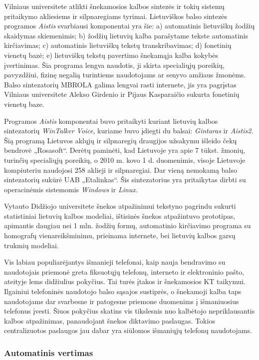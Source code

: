 \begin{multicols}{2}
    Vilniaus universitete atlikti šnekamosios kalbos sintezės ir tokių sistemų pritaikymo akliesiems ir silpnaregiams tyrimai. Lietuviškos balso sintezės programos \textit{Aistis} svarbiausi komponentai yra šie: a) automatinis lietuviškų žodžių skaidymas skiemenimis; b) žodžių lietuvių kalba parašytame tekste automatinis kirčiavimas; c) automatinis lietuviškų tekstų transkribavimas; d) fonetinių vienetų bazė; e) lietuviškų tekstų pavertimo šnekamąja kalba kokybės įvertinimas. Šia programa lengva naudotis, ji skirta specialiųjų poreikių, pavyzdžiui, fizinę negalią turintiems naudotojams ar senyvo amžiaus žmonėms. Balso sintezatorių MBROLA galima lengvai rasti internete, jis yra pagrįstas Vilniaus universitete Alekso Girdenio ir Pijaus Kasparaičio sukurta fonetinių vienetų baze.   

    Programos \textit{Aistis}  komponentai buvo pritaikyti kuriant lietuvių kalbos sintezatorių \textit{WinTalker Voice}, kuriame buvo įdiegti du balsai: \textit{Gintaras}  ir \textit{Aistis2}. Šią programą Lietuvos aklųjų ir silpnaregių draugijos užsakymu išleido čekų bendrovė „Rosasoft“. Derėtų paminėti, kad Lietuvoje yra apie 7 tūkst. žmonių, turinčių specialiųjų poreikių, o 2010 m. kovo 1 d. duomenimis, visoje Lietuvoje kompiuteriu naudojosi 258 aklieji ir silpnaregiai. Dar vieną nemokamą balso sintezatorių sukūrė UAB „Etalinkas“.  Šis sintezatorius yra pritaikytas dirbti su operacinėmis sistemomis \textit{Windows} ir \textit{Linux}.

Vytauto Didžiojo universitete šnekos atpažinimui tekstyno pagrindu sukurti statistiniai lietuvių kalbos modeliai, ištisinės šnekos atpažintuvo prototipas, apimantis daugiau nei 1 mln. žodžių formų, automatinio kirčiavimo programa su homografų vienareikšminimu, prieinama internete, bei lietuvių kalbos garsų trukmių modeliai.

Vis labiau populiarėjantys išmanieji telefonai, kaip nauja bendravimo su naudotojais priemonė greta fiksuotųjų telefonų, interneto ir elektroninio pašto, ateityje lems didžiulius pokyčius. Tai turės įtakos ir šnekamosios KT taikymui. Ilgainiui telefoninės naudotojo balso sąsajos sustiprės, o šnekamoji kalba taps naudotojams dar svarbesne ir patogesne priemone duomenims į išmaniuosius telefonus įvesti. Šiuos pokyčius skatins vis tikslesnis nuo kalbėtojo nepriklausantis kalbos atpažinimas, panaudojant šnekos diktavimo paslaugas. Tokios centralizuotos paslaugos jau dabar yra siūlomos išmaniųjų telefonų naudotojams.

\subsubsection{Automatinis vertimas}


\end{multicols}
